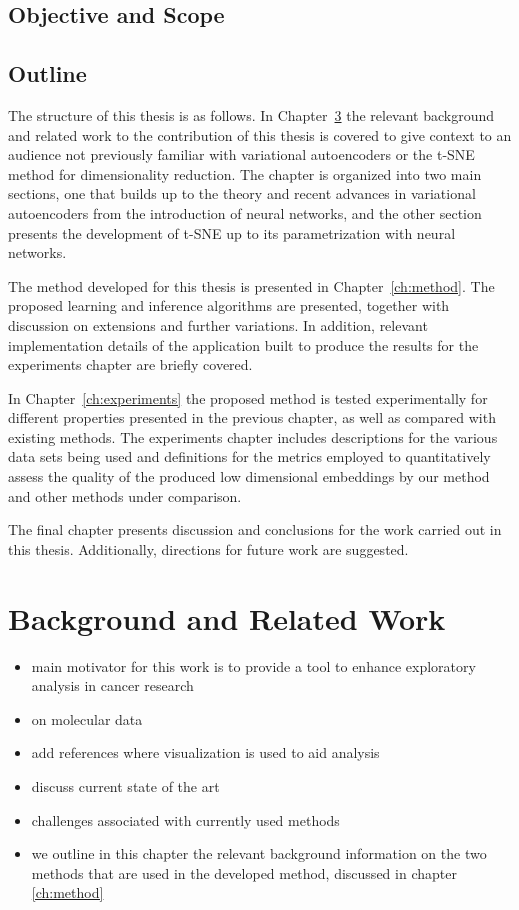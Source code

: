 
\section{Objective and Scope}

\section{Outline}

The structure of this thesis is as follows. In Chapter~\ref{ch:background_and_related_work} the relevant background and related work to the contribution of this thesis is covered to give context to an audience not previously familiar with variational autoencoders or the t-SNE method for dimensionality reduction. The chapter is organized into two main sections, one that builds up to the theory and recent advances in variational autoencoders from the introduction of neural networks, and the other section presents the development of t-SNE up to its parametrization with neural networks.

The method developed for this thesis is presented in Chapter~\ref{ch:method}. The proposed learning and inference algorithms are presented, together with discussion on extensions and further variations. In addition, relevant implementation details of the application built to produce the results for the experiments chapter are briefly covered.

In Chapter~\ref{ch:experiments} the proposed method is tested experimentally for different properties presented in the previous chapter, as well as compared with existing methods. The experiments chapter includes descriptions for the various data sets being used and definitions for the metrics employed to quantitatively assess the quality of the produced low dimensional embeddings by our method and other methods under comparison.

The final chapter presents discussion and conclusions for the work carried out in this thesis. Additionally, directions for future work are suggested.

\chapter{Background and Related Work}
\label{ch:background_and_related_work}

\begin{itemize}
\item main motivator for this work is to provide a tool to enhance exploratory analysis in cancer research
\item on molecular data
\item add references where visualization is used to aid analysis
\item discuss current state of the art
\item challenges associated with currently used methods
\item we outline in this chapter the relevant background information on the two methods that are used in the developed method, discussed in chapter \ref{ch:method}
\end{itemize}

